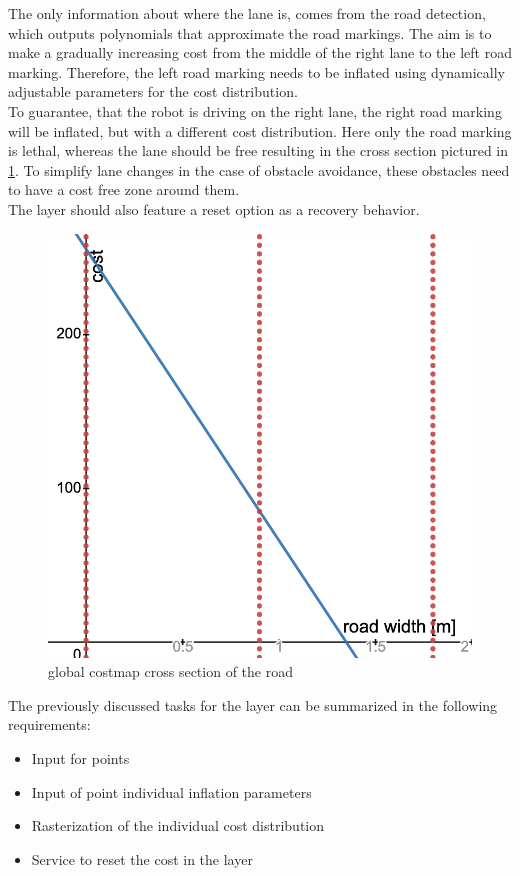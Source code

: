 The only information about where the lane is, comes from the road detection, which outputs polynomials that approximate the road markings. The aim is to make a gradually increasing cost from the middle of the right lane to the left road marking. Therefore, the left road marking needs to be inflated using dynamically adjustable parameters for the cost distribution.\\


To guarantee, that the robot is driving on the right lane, the right road marking will be inflated, but with a different cost distribution. Here only the road marking is lethal, whereas the lane should be free resulting in the cross section pictured in \ref{globalcostdistro}. To simplify lane changes in the case of obstacle avoidance, these obstacles need to have a cost free zone around them.\\

The layer should also feature a reset option as a recovery behavior.

\begin{figure}[H]
	\centering
	\includegraphics[width=.8\textwidth]{Pictures/global stage cost distro}
	\caption{global costmap cross section of the road}
	\label{globalcostdistro}
\end{figure}



The previously discussed tasks for the layer can be summarized in the following requirements:

\begin{itemize}
	\item Input for points
	\item Input of point individual inflation parameters
	\item Rasterization of the individual cost distribution
	\item Service to reset the cost in the layer
\end{itemize}



